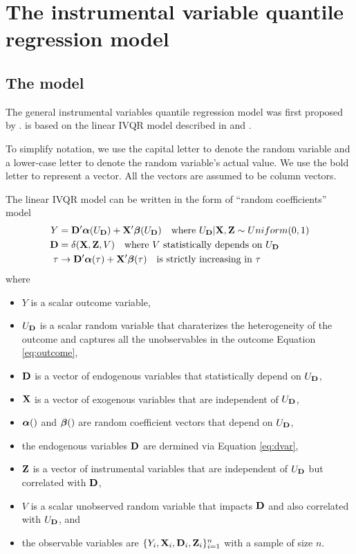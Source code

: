 \section{The instrumental variable quantile regression model} \label{sec:model}

	\subsection{The model}
The general instrumental variables quantile regression model was first
proposed by \cite{Chernozhukov2005}. {\ivqreg} is based on the linear IVQR model
described in \cite{Chernozhukov2006} and \cite{Chernozhukov2008}.

To simplify notation, we use the capital letter to denote the random variable
and a lower-case letter to denote the random variable's actual value.  We use
the bold letter to represent a vector. All the vectors are assumed to be  column
vectors.

The linear IVQR model can be written in the form of ``random
coefficients'' model
\begin{align}
Y &= \mathbf{D}' \boldsymbol{\alpha}(U_{\mathbf{D}}) + \mathbf{X}' \boldsymbol{\beta}(U_{\mathbf{D}}) \quad \text{where  $U_{\mathbf{D}}|\mathbf{X}, \mathbf{Z} \sim
Uniform(0,1)$}  \label{eq:outcome} \\
\mathbf{D} &= \delta(\mathbf{X}, \mathbf{Z}, V) \quad \text{where $V$ statistically depends on $U_{\mathbf{D}}$} 
\label{eq:dvar} \\
\tau &\rightarrow \mathbf{D}' \boldsymbol{\alpha}(\tau) + \mathbf{X}' \boldsymbol{\beta}(\tau) 
\quad \text{is strictly increasing in $\tau$}
\end{align}
where
\begin{itemize}
\item $Y$ is a scalar outcome variable,
\item $U_{\mathbf{D}}$ is a scalar random variable that charaterizes the heterogeneity of
the outcome and captures all the unobservables in the outcome Equation
\ref{eq:outcome}, 
\item $\mathbf{D}$ is a vector of endogenous variables that statistically depend on
$U_{\mathbf{D}}$, 
\item $\mathbf{X}$ is a vector of exogenous variables that are independent of $U_{\mathbf{D}}$,
\item $\boldsymbol{\alpha}()$ and $\boldsymbol{\beta}()$ are random coefficient vectors that depend on
$U_{\mathbf{D}}$, 
\item the endogenous variables $\mathbf{D}$ are dermined via Equation \ref{eq:dvar},
\item $\mathbf{Z}$ is a vector of instrumental variables that are independent of $U_{\mathbf{D}}$
but correlated with $\mathbf{D}$, 
\item $V$ is a scalar unobserved random variable that impacts $\mathbf{D}$ and also
correlated with $U_{\mathbf{D}}$, and
\item the observable variables are $\{Y_i, \mathbf{X}_i, \mathbf{D}_i, \mathbf{Z}_i\}_{i=1}^n$ with a
sample of size $n$.
\end{itemize}

